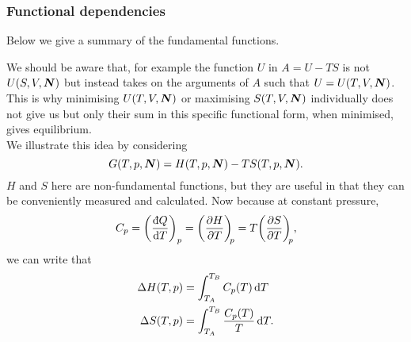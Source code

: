 \subsubsection{Functional dependencies}
Below we give a summary of the fundamental functions. \\
\begin{table}[H]
\end{table}
We should be aware that, for example the function $U$ in $A=U-TS$ is not $U(S,V,\boldsymbol{N})$ but instead takes on the arguments of $A$ such that $U=U(T,V,\boldsymbol{N})$. 
This is why minimising $U(T,V,\boldsymbol{N})$ or maximising $S(T,V,\boldsymbol{N})$ individually does not give us \eqm but only their sum in this specific functional form, when minimised, gives equilibrium. \\
We illustrate this idea by considering 
\begin{equation}
G(T,p,\boldsymbol{N})=H(T,p,\boldsymbol{N})-TS(T,p,\boldsymbol{N}).
\end{equation}
$H$ and $S$ here are non-fundamental functions, but they are useful in that they can be conveniently measured and calculated. Now because at constant pressure, 
\begin{equation}
C_p=\lf(\frac{\indiff Q}{\dif T}\rt)_p=\diffp HT[p]=T\diffp ST[p],
\end{equation}
we can write that
\begin{subequations}
\begin{align}
\Delta H(T,p)&=\int^{T_B}_{T_A}C_p(T)\dif T \\
\Delta S(T,p)&=\int^{T_B}_{T_A}\frac{C_p(T)}{T}\dif T.
\end{align}
\end{subequations}

